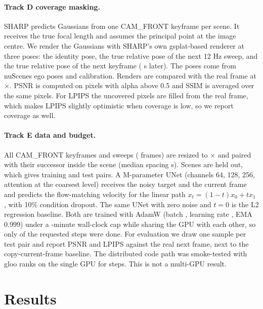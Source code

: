 \documentclass[10pt]{article}
\begin{document}
\paragraph{Track D coverage masking.}
SHARP \citep{mescheder2025sharp} predicts Gaussians from one CAM\_FRONT keyframe per scene. It receives the
true focal length and assumes the principal point at the image centre. We render the Gaussians with SHARP's
own gsplat-based renderer at three poses: the identity pose, the true relative pose of the next 12 Hz sweep,
and the true relative pose of the next keyframe (\SharpDtKeyframe{} s later). The poses come from nuScenes
ego poses and calibration. Renders are compared with the real frame at \SharpEvalW$\times$\SharpEvalH. PSNR
is computed on pixels with alpha above 0.5 and SSIM is averaged over the same pixels. For LPIPS the
uncovered pixels are filled from the real frame, which makes LPIPS slightly optimistic when coverage is
low, so we report coverage as well.

\paragraph{Track E data and budget.}
All CAM\_FRONT keyframes and sweeps (\NFframes{} frames) are resized to \NFw$\times$\NFh{} and paired
with their successor inside the scene (median spacing \NFdtMedian{} s). Scenes \NFholdoutScenes{} are held
out, which gives \NFtrainPairs{} training and \NFtestPairs{} test pairs. A \NFFmparams{}M-parameter UNet
(channels 64, 128, 256, attention at the coarsest level) receives the noisy target and the current frame
and predicts the flow-matching velocity for the linear path $x_t = (1-t)x_0 + t x_1$
\citep{lipman2023flow}, with 10\% condition dropout. The same UNet with zero noise and $t=0$ is the L2
regression baseline. Both are trained with AdamW (batch \NFFmbatch, learning rate \NFFmlr, EMA 0.999) under
a \NFFmmaxMinutes-minute wall-clock cap while sharing the GPU with each other, so only \NFFmsteps{} of the
requested \NFFmstepsRequested{} steps were done. For evaluation we draw one \NFsampler{} sample per test
pair and report PSNR and LPIPS against the real next frame, next to the copy-current-frame baseline. The
distributed code path was smoke-tested with \DDPworld{} gloo ranks on the single GPU for \DDPsteps{} steps.
This is not a multi-GPU result.

\section{Results}
\label{sec:results}
\end{document}

